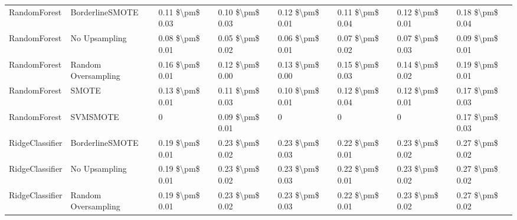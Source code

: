 \begin{tabular}{llllllll}
                   RandomForest &               BorderlineSMOTE & 0.11 \$\textbackslash pm\$ 0.03 &           0.10 \$\textbackslash pm\$ 0.03 &       0.12 \$\textbackslash pm\$ 0.01 &        0.11 \$\textbackslash pm\$ 0.04 &                         0.12 \$\textbackslash pm\$ 0.01 &     0.18 \$\textbackslash pm\$ 0.04 \\
                   RandomForest &                 No Upsampling & 0.08 \$\textbackslash pm\$ 0.01 &           0.05 \$\textbackslash pm\$ 0.02 &       0.06 \$\textbackslash pm\$ 0.01 &        0.07 \$\textbackslash pm\$ 0.02 &                         0.07 \$\textbackslash pm\$ 0.03 &     0.09 \$\textbackslash pm\$ 0.01 \\
                   RandomForest &           Random Oversampling & 0.16 \$\textbackslash pm\$ 0.01 &           0.12 \$\textbackslash pm\$ 0.00 &       0.13 \$\textbackslash pm\$ 0.00 &        0.15 \$\textbackslash pm\$ 0.03 &                         0.14 \$\textbackslash pm\$ 0.02 &     0.19 \$\textbackslash pm\$ 0.01 \\
                   RandomForest &                         SMOTE & 0.13 \$\textbackslash pm\$ 0.01 &           0.11 \$\textbackslash pm\$ 0.03 &       0.10 \$\textbackslash pm\$ 0.01 &        0.12 \$\textbackslash pm\$ 0.04 &                         0.12 \$\textbackslash pm\$ 0.01 &     0.17 \$\textbackslash pm\$ 0.03 \\
                   RandomForest &                      SVMSMOTE &               0 &           0.09 \$\textbackslash pm\$ 0.01 &                     0 &                      0 &                                       0 &     0.17 \$\textbackslash pm\$ 0.03 \\
                RidgeClassifier &               BorderlineSMOTE & 0.19 \$\textbackslash pm\$ 0.01 &           0.23 \$\textbackslash pm\$ 0.02 &       0.23 \$\textbackslash pm\$ 0.03 &        0.22 \$\textbackslash pm\$ 0.01 &                         0.23 \$\textbackslash pm\$ 0.02 &     0.27 \$\textbackslash pm\$ 0.02 \\
                RidgeClassifier &                 No Upsampling & 0.19 \$\textbackslash pm\$ 0.01 &           0.23 \$\textbackslash pm\$ 0.02 &       0.23 \$\textbackslash pm\$ 0.03 &        0.22 \$\textbackslash pm\$ 0.01 &                         0.23 \$\textbackslash pm\$ 0.02 &     0.27 \$\textbackslash pm\$ 0.02 \\
                RidgeClassifier &           Random Oversampling & 0.19 \$\textbackslash pm\$ 0.01 &           0.23 \$\textbackslash pm\$ 0.02 &       0.23 \$\textbackslash pm\$ 0.03 &        0.22 \$\textbackslash pm\$ 0.01 &                         0.23 \$\textbackslash pm\$ 0.02 &     0.27 \$\textbackslash pm\$ 0.02 \\

\end{tabular}
